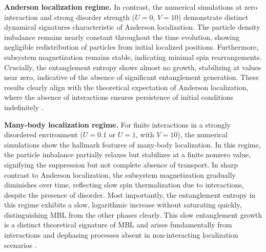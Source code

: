 \textbf{Anderson localization regime.}
In contrast, the numerical simulations at zero interaction and strong disorder strength ($U=0$, $V=10$) demonstrate distinct dynamical signatures characteristic of Anderson localization. The particle density imbalance remains nearly constant throughout the time evolution, showing negligible redistribution of particles from initial localized positions. Furthermore, subsystem magnetization remains stable, indicating minimal spin rearrangements. Crucially, the entanglement entropy shows almost no growth, stabilizing at values near zero, indicative of the absence of significant entanglement generation. These results clearly align with the theoretical expectation of Anderson localization, where the absence of interactions ensures persistence of initial conditions indefinitely \cite{anderson_absence_1958,abrahams_50_2010}.

\textbf{Many-body localization regime.}
For finite interactions in a strongly disordered environment ($U=0.1$ or $U=1$, with $V=10$), the numerical simulations show the hallmark features of many-body localization. In this regime, the particle imbalance partially relaxes but stabilizes at a finite nonzero value, signifying the suppression but not complete absence of transport. In sharp contrast to Anderson localization, the subsystem magnetization gradually diminishes over time, reflecting slow spin thermalization due to interactions, despite the presence of disorder. Most importantly, the entanglement entropy in this regime exhibits a slow, logarithmic increase without saturating quickly, distinguishing MBL from the other phases clearly. This slow entanglement growth is a distinct theoretical signature of MBL and arises fundamentally from interactions and dephasing processes absent in non-interacting localization scenarios \cite{basko_metalinsulator_2006,nandkishore_many-body_2015}.




